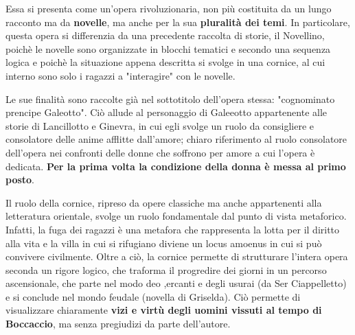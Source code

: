\documentclass[10pt,a4paper]{article}
\begin{document}
	 Essa si presenta come un'opera rivoluzionaria, non più costituita da un lungo racconto ma da \textbf{novelle}, ma anche per la sua \textbf{pluralità dei temi}. In particolare, questa opera si differenzia da una precedente raccolta di storie, il Novellino, poichè le novelle sono organizzate in blocchi tematici e secondo una sequenza logica e poichè la situazione appena descritta si svolge in una cornice, al cui interno sono solo i ragazzi a "interagire" con le novelle.

		Le sue finalità sono raccolte già nel sottotitolo dell'opera stessa: "cognominato prencipe Galeotto". Ciò allude al personaggio di Galeeotto appartenente alle storie di Lancillotto e Ginevra, in cui egli svolge un ruolo da consigliere e consolatore delle anime afflitte dall'amore; chiaro riferimento al ruolo consolatore dell'opera nei confronti delle donne che soffrono per amore a cui l'opera è dedicata. \textbf{Per la prima volta la condizione della donna è messa al primo posto}.

		Il ruolo della cornice, ripreso da opere classiche ma anche appartenenti alla letteratura orientale, svolge un ruolo fondamentale dal punto di vista metaforico. Infatti, la fuga dei ragazzi è una metafora che rappresenta la lotta per il diritto alla vita e la villa in cui si rifugiano diviene un locus amoenus in cui si può convivere civilmente.
		Oltre a ciò, la cornice permette di strutturare l'intera opera seconda un rigore logico, che traforma il progredire dei giorni in un percorso ascensionale, che parte nel modo deo ,ercanti e degli usurai (da Ser Ciappelletto) e si conclude nel mondo feudale (novella di Griselda). Ciò permette di visualizzare chiaramente \textbf{vizi e virtù degli uomini vissuti al tempo di Boccaccio}, ma senza pregiudizi da parte dell'autore.
\end{document}
